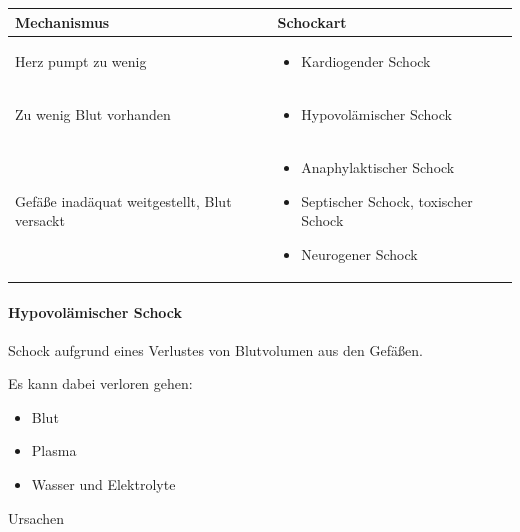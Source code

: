 \documentclass{article}
\begin{document}
\begin{center}
\begin{tabular}{|m{4.8430004cm}|m{8.457cm}|}
\hline
\centering Mechanismus\par

 &
\centering Schockart\par

\\\hline
Herz pumpt zu wenig

 &
\begin{itemize}
\item Kardiogender Schock

\end{itemize}
\\\hline
Zu wenig Blut vorhanden 

 &
\begin{itemize}
\item Hypovol\"amischer Schock

\end{itemize}
\\\hline
Gef\"a{\ss}e inad\"aquat weitgestellt, Blut versackt

 &
\begin{itemize}
\item Anaphylaktischer Schock

\item Septischer Schock, toxischer Schock

\item Neurogener Schock

\end{itemize}
\\\hline
\end{tabular}
\end{center}
\paragraph{Hypovol\"amischer Schock}
Schock aufgrund eines Verlustes von Blutvolumen aus den Gef\"a{\ss}en.

Es kann dabei verloren gehen: 

\begin{itemize}
\item Blut

\item Plasma

\item Wasser und Elektrolyte

\end{itemize}
Ursachen
\end{document}
